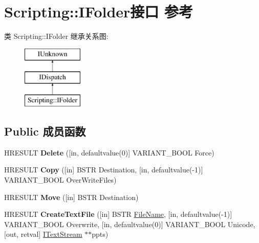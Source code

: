 \hypertarget{interface_scripting_1_1_i_folder}{}\section{Scripting\+:\+:I\+Folder接口 参考}
\label{interface_scripting_1_1_i_folder}
类 Scripting\+:\+:I\+Folder 继承关系图\+:\begin{figure}[H]
\begin{center}
\leavevmode
\includegraphics[height=3.000000cm]{interface_scripting_1_1_i_folder}
\end{center}
\end{figure}
\subsection*{Public 成员函数}
\begin{DoxyCompactItemize}
\item 
\mbox{\label{interface_scripting_1_1_i_folder_a0fe863df815633e8aae909be6ff4baff}} 
H\+R\+E\+S\+U\+LT {\bfseries Delete} (\mbox{[}in, defaultvalue(0)\mbox{]} V\+A\+R\+I\+A\+N\+T\+\_\+\+B\+O\+OL Force)
\item 
\mbox{\label{interface_scripting_1_1_i_folder_a428eee491a2abb46bc1651cd40459207}} 
H\+R\+E\+S\+U\+LT {\bfseries Copy} (\mbox{[}in\mbox{]} B\+S\+TR Destination, \mbox{[}in, defaultvalue(-\/1)\mbox{]} V\+A\+R\+I\+A\+N\+T\+\_\+\+B\+O\+OL Over\+Write\+Files)
\item 
\mbox{\label{interface_scripting_1_1_i_folder_a9c21ee1106e6c96427125510cf3923e0}} 
H\+R\+E\+S\+U\+LT {\bfseries Move} (\mbox{[}in\mbox{]} B\+S\+TR Destination)
\item 
\mbox{\label{interface_scripting_1_1_i_folder_ae0926ee70d09f2beee1ac64ee1acecbc}} 
H\+R\+E\+S\+U\+LT {\bfseries Create\+Text\+File} (\mbox{[}in\mbox{]} B\+S\+TR \hyperlink{struct___file_name}{File\+Name}, \mbox{[}in, defaultvalue(-\/1)\mbox{]} V\+A\+R\+I\+A\+N\+T\+\_\+\+B\+O\+OL Overwrite, \mbox{[}in, defaultvalue(0)\mbox{]} V\+A\+R\+I\+A\+N\+T\+\_\+\+B\+O\+OL Unicode, \mbox{[}out, retval\mbox{]} \hyperlink{interface_scripting_1_1_i_text_stream}{I\+Text\+Stream} $\ast$$\ast$ppts)
\end{DoxyCompactItemize}
